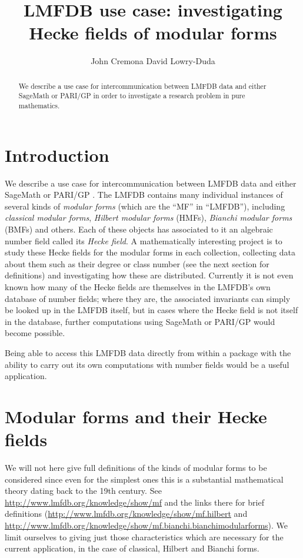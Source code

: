 \documentclass{llncs}
\title{LMFDB use case: investigating Hecke fields of modular forms}
\author{
John Cremona\inst{1}
David Lowry-Duda\inst{1}
}
\institute{
University of Warwick
}
\begin{document}
\maketitle
\begin{abstract}
  We describe a use case for intercommunication between LMFDB data and
  either SageMath or PARI/GP in order to investigate a research
  problem in pure mathematics.
\end{abstract}

\section{Introduction}
We describe a use case for intercommunication between LMFDB data and
either SageMath \cite{sage} or PARI/GP \cite{pari}.  The LMFDB
contains many individual instances of several kinds of \emph{modular
  forms} (which are the ``MF'' in ``LMFDB''), including
\emph{classical modular forms}, \emph{Hilbert modular forms} (HMFs),
\emph{Bianchi modular forms} (BMFs) and others.  Each of these objects
has associated to it an algebraic number field called its \emph{Hecke
  field}.  A mathematically interesting project is to study these
Hecke fields for the modular forms in each collection, collecting data
about them such as their degree or class number (see the next section
for definitions) and investigating how these are distributed.
Currently it is not even known how many of the Hecke fields are
themselves in the LMFDB's own database of number fields; where they
are, the associated invariants can simply be looked up in the LMFDB
itself, but in cases where the Hecke field is not itself in the
database, further computations using SageMath or PARI/GP would become
possible.

Being able to access this LMFDB data directly from within a package
with the ability to carry out its own computations with number fields
would be a useful application.

\section{Modular forms and their Hecke fields}
We will not here give full definitions of the kinds of modular forms
to be considered since even for the simplest ones this is a
substantial mathematical theory dating back to the 19th century.  See
\url{http://www.lmfdb.org/knowledge/show/mf} and the links there for
brief definitions
(\url{http://www.lmfdb.org/knowledge/show/mf.hilbert} and
\url{http://www.lmfdb.org/knowledge/show/mf.bianchi.bianchimodularforms}).
We limit ourselves to giving just those characteristics which are
necessary for the current application, in the case of classical,
Hilbert and Bianchi forms.
\end{document}
